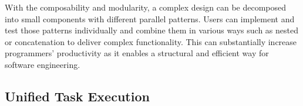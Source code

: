 \documentclass[conference]{IEEEtran}
\begin{document}
%
%
%
%
%
%
%


With the composability and modularity, a complex design
can be decomposed into small components with different parallel patterns. Users
can implement and test those patterns individually and combine them
in various ways such as nested or concatenation to deliver complex functionality. 
This can substantially increase programmers' productivity as it enables a
structural and efficient way for software engineering.  


\subsection{Unified Task Execution}

\end{document}
